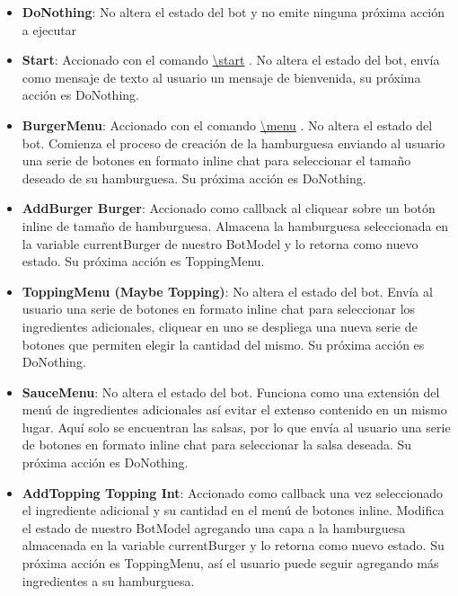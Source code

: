 \documentclass[a4paper,12pt]{article}
\begin{document}
\begin{itemize}
	\item 
	\textbf{DoNothing}: No altera el estado del bot y no emite ninguna próxima acción a ejecutar
	
	\item
	\textbf{Start}: Accionado con el comando 
	\color{blue}\uline{\textbackslash start}\color{black}
	. No altera el estado del bot, envía como mensaje de texto al usuario un mensaje de bienvenida, su próxima acción es DoNothing.
	
	\item
	\textbf{BurgerMenu}: Accionado con el comando 
	\color{blue}\uline{\textbackslash menu}\color{black}
	. No altera el estado del bot. Comienza el proceso de creación de la hamburguesa enviando al usuario una serie de botones en formato inline chat para seleccionar el tamaño deseado de su hamburguesa. Su próxima acción es DoNothing.
	
	\item
	\textbf{AddBurger  \color{blue}Burger\color{black}}: Accionado como callback al cliquear sobre un botón inline de tamaño de hamburguesa. Almacena la hamburguesa seleccionada en la variable currentBurger de nuestro BotModel y lo retorna como nuevo estado.  Su próxima acción es ToppingMenu.
	
	\item
	\textbf{ToppingMenu \color{blue}(Maybe Topping)\color{black}}: No altera el estado del bot. Envía al usuario una serie de botones en formato inline chat para seleccionar los ingredientes adicionales, cliquear en uno se despliega una nueva serie de botones que permiten elegir la cantidad del mismo. Su próxima acción es DoNothing.
	
	\item
	\textbf{SauceMenu}: No altera el estado del bot. Funciona como una extensión del menú de ingredientes adicionales así evitar el extenso contenido en un mismo lugar. Aquí solo se encuentran las salsas, por lo que envía al usuario una serie de botones en formato inline chat para seleccionar la salsa deseada. Su próxima acción es DoNothing.
	
	\item
	\textbf{AddTopping \color{blue}Topping Int\color{black}}: Accionado como callback una vez seleccionado el ingrediente adicional y su cantidad en el menú de botones inline. Modifica el estado de nuestro BotModel agregando una capa a la hamburguesa almacenada en la variable currentBurger y lo retorna como nuevo estado.  Su próxima acción es ToppingMenu, así el usuario puede seguir agregando más ingredientes a su hamburguesa.
	

\end{itemize}
\end{document}
